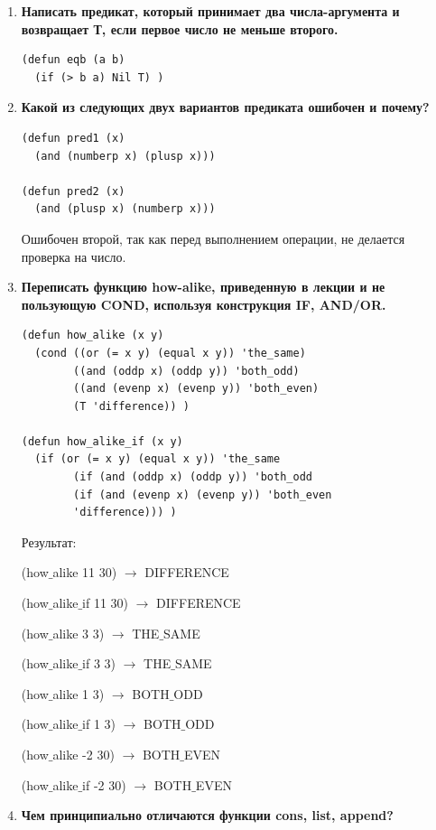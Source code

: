 \documentclass[a4paper,14pt]{extreport} %
\begin{document}
\begin{enumerate}
\item \textbf{Написать предикат, который принимает два числа-аргумента и возвращает Т, если первое число не меньше второго.}

\begin{lstlisting}
(defun eqb (a b)
  (if (> b a) Nil T) )
\end{lstlisting}

\item \textbf{Какой из следующих двух вариантов предиката ошибочен и почему?}

\begin{lstlisting}
(defun pred1 (x)
  (and (numberp x) (plusp x)))

(defun pred2 (x)
  (and (plusp x) (numberp x)))
\end{lstlisting}

Ошибочен второй, так как перед выполнением операции, не делается проверка на число. 

\item \textbf{Переписать функцию how-alike, приведенную в лекции и не пользующую COND, используя конструкция IF, AND/OR.}

\begin{lstlisting}
(defun how_alike (x y)
  (cond ((or (= x y) (equal x y)) 'the_same)
        ((and (oddp x) (oddp y)) 'both_odd)
        ((and (evenp x) (evenp y)) 'both_even)
        (T 'difference)) )

(defun how_alike_if (x y)
  (if (or (= x y) (equal x y)) 'the_same
        (if (and (oddp x) (oddp y)) 'both_odd
        (if (and (evenp x) (evenp y)) 'both_even 
        'difference))) )
\end{lstlisting}

Результат:

(how$\_$alike 11 30) $\to$ DIFFERENCE

(how$\_$alike$\_$if 11 30) $\to$ DIFFERENCE

(how$\_$alike 3 3) $\to$ THE$\_$SAME

(how$\_$alike$\_$if 3 3) $\to$ THE$\_$SAME

(how$\_$alike 1 3) $\to$ BOTH$\_$ODD

(how$\_$alike$\_$if 1 3) $\to$ BOTH$\_$ODD

(how$\_$alike -2 30) $\to$ BOTH$\_$EVEN

(how$\_$alike$\_$if -2 30) $\to$ BOTH$\_$EVEN

\item \textbf{Чем принципиально отличаются функции cons, list, append?}


\end{enumerate}
\end{document}
